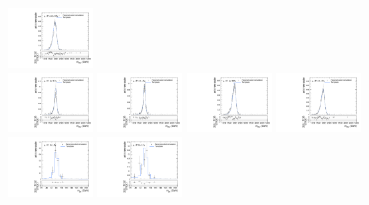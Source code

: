\begin{figure}[htpb]
  \includegraphics[width=0.2\textwidth]{fig/analysisAppendix/templateVsReco_VBFZprToWW2000_r0_MVV_mu_LP_nobb_HDy_linear.pdf}\\
  \includegraphics[width=0.2\textwidth]{fig/analysisAppendix/templateVsReco_VBFZprToWW2000_r0_MVV_mu_HP_vbf_LDy_linear.pdf}
  \includegraphics[width=0.2\textwidth]{fig/analysisAppendix/templateVsReco_VBFZprToWW2000_r0_MVV_mu_LP_vbf_LDy_linear.pdf}
  \includegraphics[width=0.2\textwidth]{fig/analysisAppendix/templateVsReco_VBFZprToWW2000_r0_MVV_mu_HP_vbf_HDy_linear.pdf}
  \includegraphics[width=0.2\textwidth]{fig/analysisAppendix/templateVsReco_VBFZprToWW2000_r0_MVV_mu_LP_vbf_HDy_linear.pdf}\\
  \includegraphics[width=0.2\textwidth]{fig/analysisAppendix/templateVsReco_VBFZprToWW2000_r0_MJ_mu_HP_bb_LDy.pdf}
  \includegraphics[width=0.2\textwidth]{fig/analysisAppendix/templateVsReco_VBFZprToWW2000_r0_MJ_mu_LP_bb_LDy.pdf}

\end{figure}
